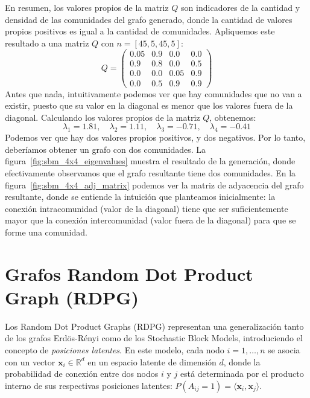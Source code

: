 \documentclass{article}
\begin{document}
En resumen, los valores propios de la matriz $Q$ son indicadores de la cantidad y densidad de las comunidades del grafo generado, donde la cantidad de valores
propios positivos es igual a la cantidad de comunidades. Apliquemos este resultado a una matriz $Q$ con $n=[45, 5, 45, 5]$:
\begin{equation}
    \label{eq:sbm_4x4_matrix}
    Q = \begin{pmatrix}
        0.05 & 0.9 & 0.0 & 0.0 \\
        0.9 & 0.8 & 0.0 & 0.5 \\
        0.0 & 0.0 & 0.05 & 0.9 \\
        0.0 & 0.5 & 0.9 & 0.9
    \end{pmatrix}
\end{equation}
Antes que nada, intuitivamente podemos ver que hay comunidades que no van a existir, puesto que su valor en la diagonal es menor que los valores
fuera de la diagonal. Calculando los valores propios de la matriz $Q$, obtenemos:
\begin{equation}
    \label{eq:sbm_4x4_eigenvalues}
    \lambda_1 = 1.81, \quad\lambda_2 = 1.11, \quad\lambda_3 = -0.71, \quad\lambda_4 = -0.41
\end{equation}
Podemos ver que hay dos valores propios positivos, y dos negativos. Por lo tanto, deberíamos obtener un grafo con dos comunidades. 
La figura~\ref{fig:sbm_4x4_eigenvalues} muestra el resultado de la generación, donde efectivamente observamos que el grafo resultante
tiene dos comunidades. En la figura~\ref{fig:sbm_4x4_adj_matrix} podemos ver la matriz de adyacencia del grafo resultante, donde se entiende
la intuición que planteamos inicialmente: la conexión intracomunidad (valor de la diagonal) tiene que ser suficientemente mayor que la conexión intercomunidad (valor fuera de la diagonal) para que se forme una comunidad.

\section{Grafos Random Dot Product Graph (RDPG)}
\label{sec:rdpg}

Los Random Dot Product Graphs (RDPG) representan una generalización tanto de los grafos Erdös-Rényi como de los Stochastic Block Models, introduciendo el concepto de \emph{posiciones latentes}. En este modelo, cada nodo $i = 1, \ldots, n$ se asocia con un vector $\mathbf{x}_i \in \mathbb{R}^d$ en un espacio latente de dimensión $d$, donde la probabilidad de conexión entre dos nodos $i$ y $j$ está determinada por el producto interno de sus respectivas posiciones latentes: $P(A_{ij} = 1) = \langle \mathbf{x}_i, \mathbf{x}_j \rangle$.
\end{document}
